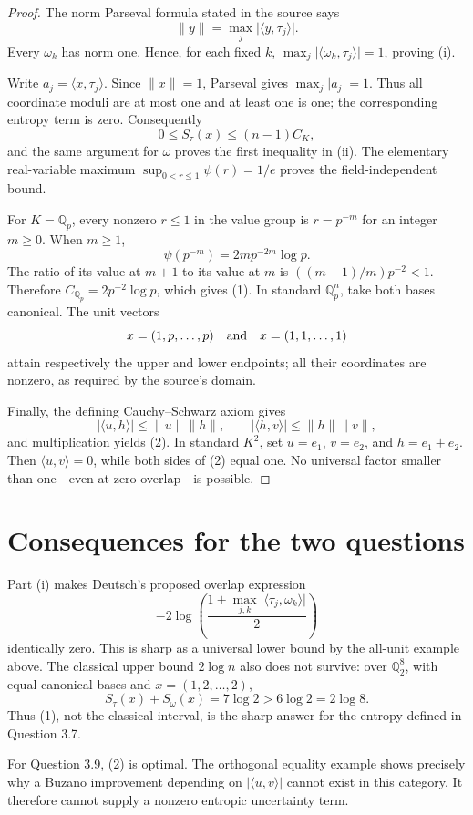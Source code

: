 \documentclass[11pt]{article}
\newcommand{\Qp}{\mathbb Q_p}
\newcommand{\abs}[1]{\lvert#1\rvert}
\begin{document}
\begin{proof}
The norm Parseval formula stated in the source says
\[
 \|y\|=\max_j\abs{\langle y,\tau_j\rangle}.
\]
Every $\omega_k$ has norm one.  Hence, for each fixed $k$,
$\max_j\abs{\langle\omega_k,\tau_j\rangle}=1$, proving (i).

Write $a_j=\langle x,\tau_j\rangle$.  Since $\|x\|=1$, Parseval gives
$\max_j\abs{a_j}=1$.  Thus all coordinate moduli are at most one and at
least one is one; the corresponding entropy term is zero.  Consequently
\[
 0\le S_\tau(x)\le(n-1)C_K,
\]
and the same argument for $\omega$ proves the first inequality in (ii).
The elementary real-variable maximum $\sup_{0<r\le1}\psi(r)=1/e$ proves
the field-independent bound.

For $K=\Qp$, every nonzero $r\le1$ in the value group is $r=p^{-m}$ for
an integer $m\ge0$.  When $m\ge1$,
\[
 \psi(p^{-m})=2m p^{-2m}\log p.
\]
The ratio of its value at $m+1$ to its value at $m$ is
$((m+1)/m)p^{-2}<1$.  Therefore $C_{\Qp}=2p^{-2}\log p$, which gives
(1).  In standard $\Qp^n$, take both bases canonical.  The unit vectors
\[
 x=(1,p,\ldots,p)\quad\hbox{and}\quad x=(1,1,\ldots,1)
\]
attain respectively the upper and lower endpoints; all their coordinates
are nonzero, as required by the source's domain.

Finally, the defining Cauchy--Schwarz axiom gives
\[
 \abs{\langle u,h\rangle}\le\|u\|\|h\|,
 \qquad
 \abs{\langle h,v\rangle}\le\|h\|\|v\|,
\]
and multiplication yields (2).  In standard $K^2$, set
$u=e_1$, $v=e_2$, and $h=e_1+e_2$.  Then $\langle u,v\rangle=0$, while
both sides of (2) equal one.  No universal factor smaller than one---even
at zero overlap---is possible.
\end{proof}

\section*{Consequences for the two questions}
Part (i) makes Deutsch's proposed overlap expression
\[
 -2\log\!\left(\frac{1+\max_{j,k}
 \abs{\langle\tau_j,\omega_k\rangle}}2\right)
\]
identically zero.  This is sharp as a universal lower bound by the all-unit
example above.  The classical upper bound $2\log n$ also does not survive:
over $\mathbb Q_2^8$, with equal canonical bases and
$x=(1,2,\ldots,2)$,
\[
 S_\tau(x)+S_\omega(x)=7\log2>6\log2=2\log8. \tag{3}
\]
Thus (1), not the classical interval, is the sharp answer for the entropy
defined in Question 3.7.

For Question 3.9, (2) is optimal.  The orthogonal equality example shows
precisely why a Buzano improvement depending on
$\abs{\langle u,v\rangle}$ cannot exist in this category.  It therefore
cannot supply a nonzero entropic uncertainty term.
\end{document}

